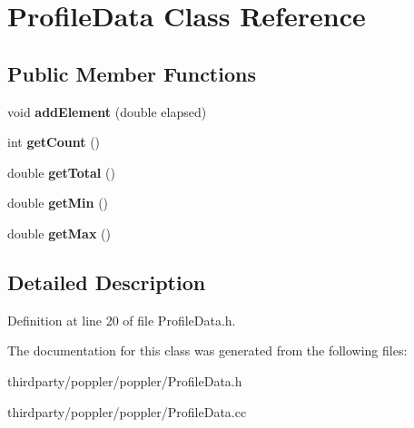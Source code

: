 \hypertarget{class_profile_data}{}\section{Profile\+Data Class Reference}
\label{class_profile_data}
\subsection*{Public Member Functions}
\begin{DoxyCompactItemize}
\item 
\mbox{\label{class_profile_data_a90b05899cb0e09aee1092bc86c6e0938}} 
void {\bfseries add\+Element} (double elapsed)
\item 
\mbox{\label{class_profile_data_a5862d0335b801c05b17b48c37d5eaaf4}} 
int {\bfseries get\+Count} ()
\item 
\mbox{\label{class_profile_data_a3ea89e3e209c3e90242b2f4b83e66465}} 
double {\bfseries get\+Total} ()
\item 
\mbox{\label{class_profile_data_ad1f7520d2a8dee173244deeef77ed4e3}} 
double {\bfseries get\+Min} ()
\item 
\mbox{\label{class_profile_data_a2d65a52ab85dba90c6bf59d28d3f5b69}} 
double {\bfseries get\+Max} ()
\end{DoxyCompactItemize}


\subsection{Detailed Description}


Definition at line 20 of file Profile\+Data.\+h.



The documentation for this class was generated from the following files\+:\begin{DoxyCompactItemize}
\item 
thirdparty/poppler/poppler/Profile\+Data.\+h\item 
thirdparty/poppler/poppler/Profile\+Data.\+cc\end{DoxyCompactItemize}
